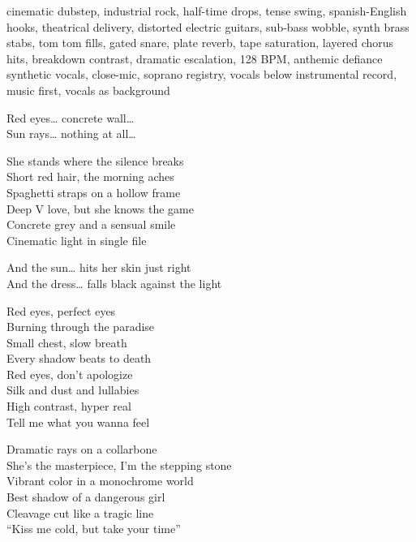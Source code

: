 
\begin{notes}
\end{notes}
\begin{style}
cinematic dubstep, industrial rock, half-time drops, tense swing, spanish-English hooks, theatrical delivery, distorted electric guitars, sub-bass wobble, synth brass stabs, tom tom fills, gated snare, plate reverb, tape saturation, layered chorus hits, breakdown contrast, dramatic escalation, 128 BPM, anthemic defiance\\
synthetic vocals, close-mic, soprano registry, vocals below instrumental record, music first, vocals as background
\end{style}
\begin{lyrics}
Red eyes… concrete wall…\\
Sun rays… nothing at all…

She stands where the silence breaks\\
Short red hair, the morning aches\\
Spaghetti straps on a hollow frame\\
Deep V love, but she knows the game\\
Concrete grey and a sensual smile\\
Cinematic light in single file

And the sun… hits her skin just right\\
And the dress… falls black against the light

Red eyes, perfect eyes\\
Burning through the paradise\\
Small chest, slow breath\\
Every shadow beats to death\\
Red eyes, don’t apologize\\
Silk and dust and lullabies\\
High contrast, hyper real\\
Tell me what you wanna feel

Dramatic rays on a collarbone\\
She’s the masterpiece, I’m the stepping stone\\
Vibrant color in a monochrome world\\
Best shadow of a dangerous girl\\
Cleavage cut like a tragic line\\
“Kiss me cold, but take your time”


\end{lyrics}
